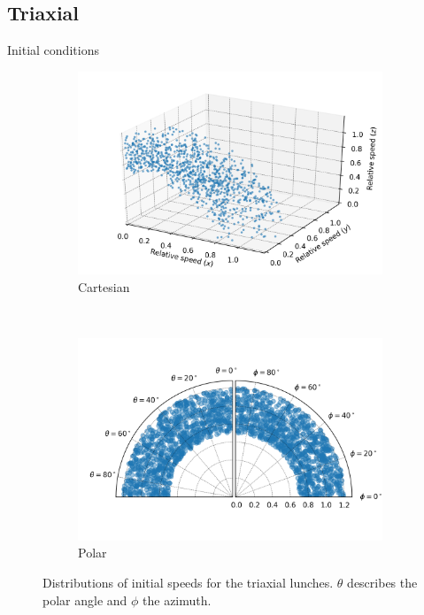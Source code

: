 \documentclass{beamer}
\begin{document}
\subsection{Triaxial}
\begin{frame}{Initial conditions}
	\begin{figure}[h]
		\centering
		\begin{subfigure}[b]{0.475\textwidth}
			\includegraphics[width = \textwidth]{"../Files/Week 13/3d_initial_speeds"}
			\caption{Cartesian}
		\end{subfigure}
		~ 
		\begin{subfigure}[b]{0.475\textwidth}
			\includegraphics[width=\textwidth]{"../Files/Week 13/polar_initial_speeds"}
			\caption{Polar}
		\end{subfigure}
		\caption{Distributions of initial speeds for the triaxial lunches. $\theta$ describes the polar angle and $\phi$ the azimuth.}
		\label{fig: initialSpeedDistributions}
	\end{figure}
\end{frame}
\end{document}
